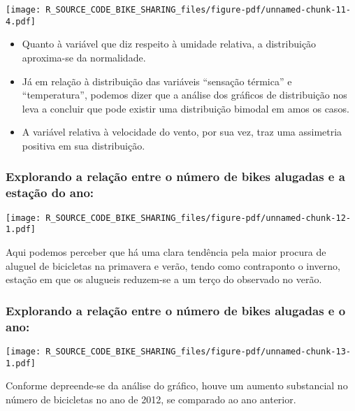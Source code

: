 \documentclass[
  letterpaper,
  DIV=11,
  numbers=noendperiod]{scrartcl}
\begin{document}
\begin{center}
\texttt{[image: R\_SOURCE\_CODE\_BIKE\_SHARING\_files/figure-pdf/unnamed-chunk-11-4.pdf]}
\end{center}

\begin{itemize}
\item
  Quanto à variável que diz respeito à umidade relativa, a distribuição
  aproxima-se da normalidade.
\item
  Já em relação à distribuição das variáveis ``sensação térmica'' e
  ``temperatura'', podemos dizer que a análise dos gráficos de
  distribuição nos leva a concluir que pode existir uma distribuição
  bimodal em amos os casos.
\item
  A variável relativa à velocidade do vento, por sua vez, traz uma
  assimetria positiva em sua distribuição.
\end{itemize}

\subsubsection{Explorando a relação entre o número de bikes alugadas e a
estação do
ano:}\label{explorando-a-relauxe7uxe3o-entre-o-nuxfamero-de-bikes-alugadas-e-a-estauxe7uxe3o-do-ano}

\begin{center}
\texttt{[image: R\_SOURCE\_CODE\_BIKE\_SHARING\_files/figure-pdf/unnamed-chunk-12-1.pdf]}
\end{center}

Aqui podemos perceber que há uma clara tendência pela maior procura de
aluguel de bicicletas na primavera e verão, tendo como contraponto o
inverno, estação em que os alugueis reduzem-se a um terço do observado
no verão.

\subsubsection{Explorando a relação entre o número de bikes alugadas e o
ano:}\label{explorando-a-relauxe7uxe3o-entre-o-nuxfamero-de-bikes-alugadas-e-o-ano}

\begin{center}
\texttt{[image: R\_SOURCE\_CODE\_BIKE\_SHARING\_files/figure-pdf/unnamed-chunk-13-1.pdf]}
\end{center}

Conforme depreende-se da análise do gráfico, houve um aumento
substancial no número de bicicletas no ano de 2012, se comparado ao ano
anterior.
\end{document}
